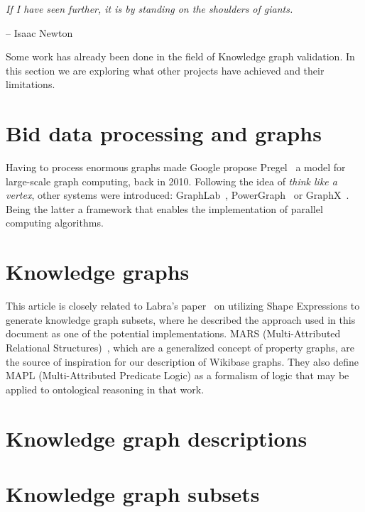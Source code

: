 \epigraph{\textit{If I have seen further, it is by standing on the shoulders of giants.}}{-- \textup{Isaac Newton}}

Some work has already been done in the field of Knowledge graph validation. In this section we are exploring what other projects have achieved and their limitations.

\section{Bid data processing and graphs}

Having to process enormous graphs made Google propose Pregel~\cite{10.1145/1807167.1807184} a model for large-scale graph computing, back in 2010. Following the idea of \textit{think like a vertex}, other systems were introduced: GraphLab~\cite{10.14778/2212351.2212354}, PowerGraph~\cite{180251} or GraphX~\cite{186216}. Being the latter a framework that enables the implementation of parallel computing algorithms.

\section{Knowledge graphs}

This article is closely related to Labra's paper~\cite{https://doi.org/10.48550/arxiv.2110.11709} on utilizing Shape Expressions to generate knowledge graph subsets, where he described the approach used in this document as one of the potential implementations. MARS (Multi-Attributed Relational Structures)~\cite{ijcai2017p165}, which are a generalized concept of property graphs, are the source of inspiration for our description of Wikibase graphs. They also define MAPL (Multi-Attributed Predicate Logic) as a formalism of logic that may be applied to ontological reasoning in that work.

\section{Knowledge graph descriptions}

\section{Knowledge graph subsets}